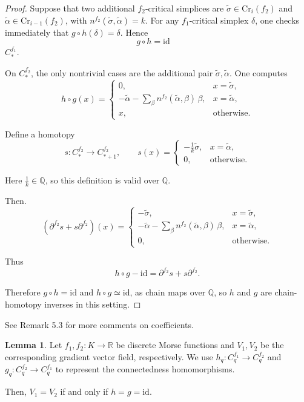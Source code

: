 \documentclass[a4paper,12pt,notitlepage]{amsart}
\theoremstyle{definition}%
\newtheorem{lemma}[theorem]{Lemma}
\theoremstyle{definition}%
\theoremstyle{definition}%
\newcommand{\id}{\text{id}}
\begin{document}
\begin{proof}
Suppose that two additional $f_2$-critical simplices are 
$\tilde{\sigma} \in \mathrm{Cr}_i(f_2)$ 
and $\tilde{\alpha} \in \mathrm{Cr}_{i-1}(f_2)$,
with $n^{f_2}(\tilde{\sigma}, \tilde{\alpha})=k$.
For any $f_1$-critical simplex $\delta$, one checks immediately that 
$g\circ h(\delta)=\delta$. Hence 
\[ g\circ h = \mathrm{id} \quad\]
  $C^{f_1}_\ast .$ 

On $C^{f_2}_\ast$, the only nontrivial cases are the additional pair 
$\tilde{\sigma},\tilde{\alpha}$. One computes
\[
h\circ g(x) = 
\begin{cases}
0, & x=\tilde{\sigma},\\[6pt]
-\tilde{\alpha}-\sum\limits_{\beta} n^{f_2}(\tilde{\alpha},\beta)\,\beta, & x=\tilde{\alpha},\\[10pt]
x, & \text{otherwise}.
\end{cases}
\]

Define a homotopy
\[
s: C^{f_2}_\ast \to C^{f_2}_{\ast+1}, 
\qquad
s(x) = 
\begin{cases}
-\tfrac{1}{k}\tilde{\sigma}, & x=\tilde{\alpha},\\[6pt]
0, & \text{otherwise}.
\end{cases}
\]

Here $\tfrac{1}{k}\in \mathbb{Q}$, so this definition is valid over
$\mathbb{Q}.$

Then.
\[
(\partial^{f_2}s+s\partial^{f_2})(x) = 
\begin{cases}
-\tilde{\sigma}, & x=\tilde{\sigma},\\[6pt]
-\tilde{\alpha}-\sum\limits_{\beta} n^{f_2}(\tilde{\alpha},\beta)\,\beta, & x=\tilde{\alpha},\\[10pt]
0, & \text{otherwise}.
\end{cases}
\]

Thus
\[
h\circ g - \mathrm{id} = \partial^{f_2}s+s\partial^{f_2}.
\]

Therefore $g\circ h=\mathrm{id}$ and $h\circ g\simeq \mathrm{id}$, 
as chain maps over $\mathbb{Q}$, so $h$ and $g$ are chain-homotopy inverses in this setting.

\end{proof}

See Remark 5.3 for more comments on coefficients.

\begin{lemma}
\label{lem:equivalence}
Let $f_1, f_2: K\to \mathbb{R}$
be discrete Morse functions
and $V_1, V_2$ be the corresponding gradient vector
field, respectively.
We use 
$h_q: C_q^{f_1} \to C_q^{f_2}$ 
and 
$g_q: C_q^{f_2} \to C_q^{f_1}$ 
to represent the connectedness homomorphisms.

Then, $V_1=V_2$
if and only if $h=g=\id.$
\label{f_1=f_2}
\end{lemma}
\end{document}

